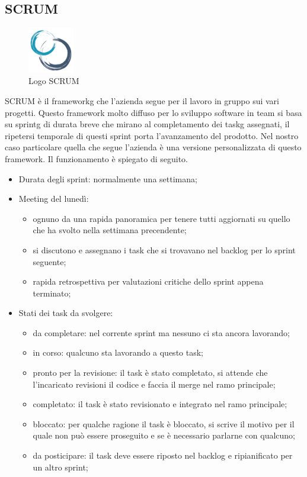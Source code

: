 \subsection*{SCRUM}
\begin{figure}[H]
  \centering
  \includegraphics[width=2cm]{immagini/logo-SCRUM.jpg}
  \caption{Logo SCRUM}
\end{figure}
\gls{SCRUM} è il \gls{frameworkg} che l'azienda segue per il lavoro in gruppo sui vari progetti. Questo framework molto diffuso per lo sviluppo software in
team si basa su \gls{sprintg} di durata breve che mirano al completamento dei \gls{taskg} assegnati, il ripetersi temporale di questi sprint porta l'avanzamento
del prodotto. Nel nostro caso particolare quella che segue l'azienda è una versione personalizzata di questo framework. Il funzionamento è spiegato di seguito.
\begin{itemize}
  \item Durata degli sprint: normalmente una settimana;
  \item Meeting del lunedì:
        \begin{itemize}
          \item ognuno da una rapida panoramica per tenere tutti aggiornati su quello che ha svolto nella settimana precendente;
          \item si discutono e assegnano i task che si trovavano nel backlog per lo sprint seguente;
          \item rapida retrospettiva per valutazioni critiche dello sprint appena terminato;
        \end{itemize}
  \item Stati dei task da svolgere:
        \begin{itemize}
          \item da completare: nel corrente sprint ma nessuno ci sta ancora lavorando;
          \item in corso: qualcuno sta lavorando a questo task;
          \item pronto per la revisione: il task è stato completato, si attende che l'incaricato revisioni il codice e faccia il merge nel ramo principale;
          \item completato: il task è stato revisionato e integrato nel ramo principale;
          \item bloccato: per qualche ragione il task è bloccato, si scrive il motivo per il quale non può essere proseguito e se è necessario parlarne con qualcuno;
          \item da posticipare: il task deve essere riposto nel backlog e ripianificato per un altro sprint;
        \end{itemize}
\end{itemize}

